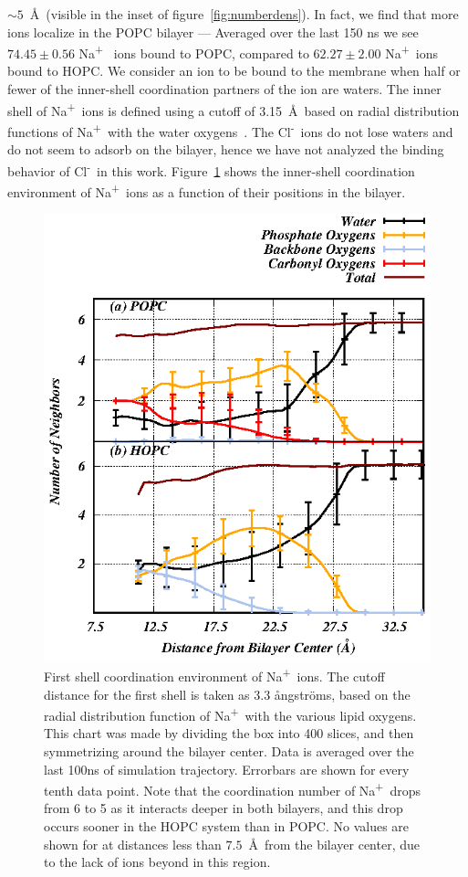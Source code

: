 \documentclass[12pt,openany,final]{book}
\newcommand{\na}{Na\textsuperscript{+}~}
\newcommand{\cl}{Cl\textsuperscript{-}~}
\newcommand{\aangstroms}{{\aa}ngstr{\"o}ms}
\begin{document}
$\sim5$~\AA~(visible in the inset of figure~\ref{fig:numberdens}). 
In fact, we find that more ions localize in the POPC bilayer --- Averaged over the last 150 ns we see
$74.45 \pm 0.56$ \na  
ions bound to POPC, 
compared to 
$62.27\pm 2.00$ \na ions bound to HOPC.
We consider an ion to be bound to the membrane when half or fewer of the inner-shell coordination partners of the 
ion are waters. The inner shell of \na ions is defined using a cutoff of 3.15~\AA~based on radial distribution functions of \na with the water oxygens~\cite{varma:2008:JACS}.
The \cl ions do not lose waters and do not seem to adsorb on the bilayer, hence we have not analyzed
the binding behavior of \cl in this work.
Figure~\ref{fig:cationcood} shows the inner-shell coordination environment of \na ions as a 
function of their positions in the bilayer. 
\begin{figure}[p]
    \caption[First shell coordination environment of \na ions.]{ 
First shell coordination environment of \na ions. The cutoff distance for the first shell is taken as 3.3 
\aangstroms, based on the radial distribution function of \na with the various lipid oxygens.
This chart was made by dividing the box into 400 slices, and then symmetrizing around the bilayer 
center. Data is averaged over the last 100ns of simulation trajectory. Errorbars are shown for every tenth data point. 
Note that the coordination number of \na drops from 6 to 5 as it interacts deeper in both bilayers, and
this drop occurs sooner in the HOPC system than in POPC. 
No values are shown for at distances less than $7.5$~\AA~from the bilayer center, due to the lack of ions beyond in this region. 
}
\label{fig:cationcood}
\includegraphics[height=0.66\textheight]{cood.eps}
\end{figure}
\end{document}
